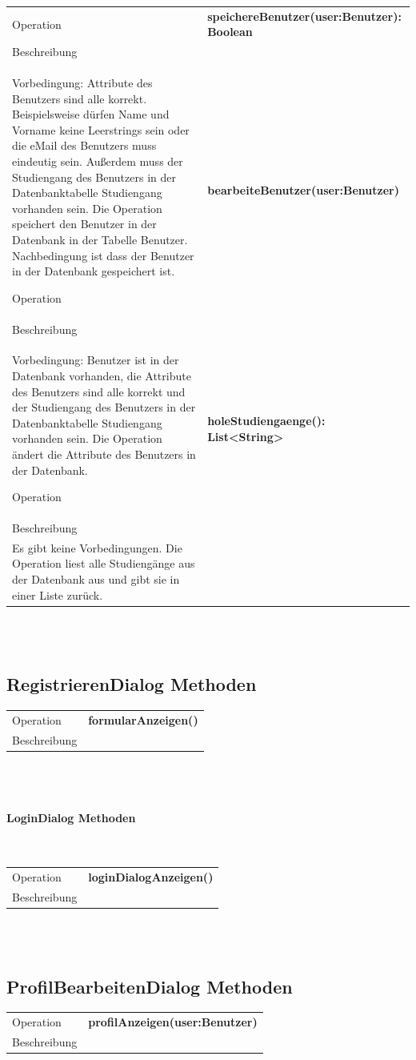 \documentclass[12pt]{scrreprt}
\begin{document}
\begin{tabular}{|lp{12cm}|}
	\hline
	Operation &  \textbf{speichereBenutzer(user:Benutzer): Boolean}\\ 
	Beschreibung & \\ Vorbedingung: Attribute des Benutzers sind alle korrekt. Beispielsweise dürfen Name und Vorname keine Leerstrings sein oder die eMail des Benutzers muss eindeutig sein. Außerdem muss der Studiengang des Benutzers in der Datenbanktabelle Studiengang vorhanden sein. Die Operation speichert den Benutzer in der Datenbank in der Tabelle Benutzer. Nachbedingung ist dass der Benutzer in der Datenbank gespeichert ist.
	\hline 
	
	Operation &  \textbf{bearbeiteBenutzer(user:Benutzer)}\\ 
	Beschreibung & \\ Vorbedingung: Benutzer ist in der Datenbank vorhanden, die Attribute des Benutzers sind alle korrekt und der Studiengang des Benutzers in der Datenbanktabelle Studiengang vorhanden sein. Die Operation ändert die Attribute des Benutzers in der Datenbank.
	\hline 
	
	Operation &  \textbf{holeStudiengaenge(): List<String>}\\ 
	Beschreibung & \\ Es gibt keine Vorbedingungen. Die Operation liest alle Studiengänge aus der Datenbank aus und gibt sie in einer Liste zurück.
		\hline 
\end{tabular} \\\\


\subsection{RegistrierenDialog  Methoden}

\begin{tabular}{|lp{12cm}|}
	\hline
	Operation &  \textbf{formularAnzeigen()}\\ 
	Beschreibung & \\ 
	\hline 
\end{tabular} \\\\

\paragraph{LoginDialog  Methoden}\mbox{}\\

\begin{tabular}{|lp{12cm}|}
	\hline
	Operation &  \textbf{loginDialogAnzeigen()}\\ 
	Beschreibung & \\ 
	\hline 
\end{tabular} \\\\

\subsection{ProfilBearbeitenDialog  Methoden}

\begin{tabular}{|lp{12cm}|}
	\hline
	Operation &  \textbf{profilAnzeigen(user:Benutzer)}\\ 
	Beschreibung & \\ 
	\hline 
\end{tabular} \\\\
\end{document}
